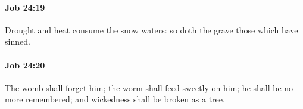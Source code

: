 		\paragraph{Job 24:19} %
			\label{JOB-24-19}

			Drought and heat consume the snow waters: so doth the grave those which have sinned.


		\paragraph{Job 24:20} %
			\label{JOB-24-20}

			The womb shall forget him; the worm shall feed sweetly on him; he shall be no more remembered; and wickedness shall be broken as a tree.


